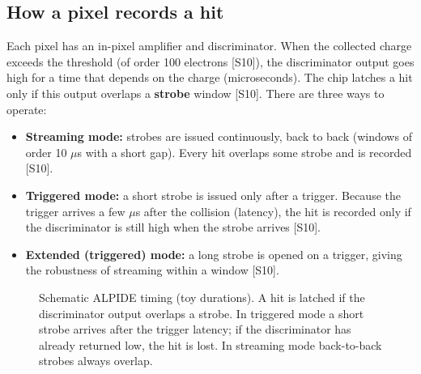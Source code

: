 \documentclass[11pt,letterpaper]{article}
\begin{document}
\subsection{How a pixel records a hit}
Each pixel has an in-pixel amplifier and discriminator.
When the collected charge exceeds the threshold (of order 100 electrons [S10]), the discriminator output goes high for a time that depends on the charge (microseconds).
The chip latches a hit only if this output overlaps a \textbf{strobe} window [S10].
There are three ways to operate:
\begin{itemize}
\item \textbf{Streaming mode:} strobes are issued continuously, back to back (windows of order 10 $\mu$s with a short gap). Every hit overlaps some strobe and is recorded [S10].
\item \textbf{Triggered mode:} a short strobe is issued only after a trigger. Because the trigger arrives a few $\mu$s after the collision (latency), the hit is recorded only if the discriminator is still high when the strobe arrives [S10].
\item \textbf{Extended (triggered) mode:} a long strobe is opened on a trigger, giving the robustness of streaming within a window [S10].
\end{itemize}

\begin{figure}[!htbp]\centering
{}
\caption{Schematic ALPIDE timing (toy durations). A hit is latched if the discriminator output overlaps a strobe. In triggered mode a short strobe arrives after the trigger latency; if the discriminator has already returned low, the hit is lost. In streaming mode back-to-back strobes always overlap.}\label{fig:strobe}
\end{figure}
\end{document}
